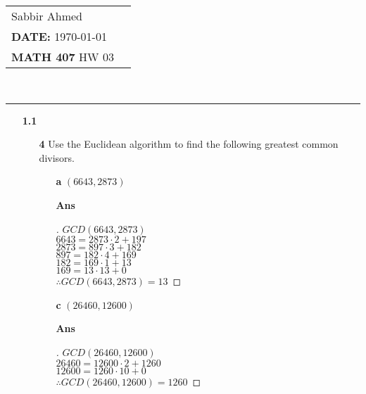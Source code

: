 \documentclass[paper=usletter, fontsize=12pt]{article}
\newcommand{\documentinfo}[5]{
    \begin{centering}
        \parbox{2in}{
        \begin{spacing}{1}
            \begin{flushleft}
                \begin{tabular}{l l}
                    #1 \\
                    #2 \\
                    #3 \\
                \end{tabular}\\
                \rule{\textwidth}{1pt}
            \end{flushleft}
        \end{spacing}
        }
    \end{centering}
}
\begin{document}
    \documentinfo{Sabbir Ahmed}{\textbf{DATE:} \today}{\textbf{MATH 407} HW 03}
    \vspace{-0.2in}

    \begin{itemize}

        \item[\textbf{1.1}]

            \begin{itemize}

                \item[\textbf{4}] Use the Euclidean algorithm to find the
                following greatest common divisors.

                \begin{itemize}

                    \item[\textbf{a}] $(6643, 2873)$
                    \item[\textbf{Ans}]
                    \begin{proof}[\unskip\nopunct]
                        $GCD(6643, 2873)$ \\
                        $6643 = 2873 \cdot 2 + 197$ \\
                        $2873 = 897 \cdot 3 + 182$ \\
                        $897 = 182 \cdot 4 + 169$ \\
                        $182 = 169 \cdot 1 + 13$ \\
                        $169 = 13 \cdot 13 + 0$ \\
                        $\therefore GCD(6643, 2873) = 13$ \qedhere
                    \end{proof}
                    \vspace{0.2in}

                    \item[\textbf{c}] $(26460, 12600)$
                    \item[\textbf{Ans}]
                    \begin{proof}[\unskip\nopunct]
                        $GCD(26460, 12600)$ \\
                        $26460 = 12600 \cdot 2 + 1260$ \\
                        $12600 = 1260 \cdot 10 + 0$ \\
                        $\therefore GCD(26460, 12600) = 1260$ \qedhere
                    \end{proof}
                    \vspace{0.2in}


\end{itemize}
\end{itemize}
\end{itemize}
\end{document}

